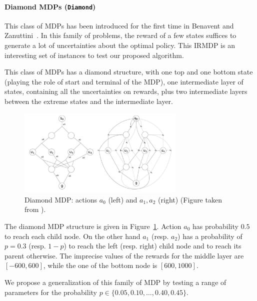 \paragraph{Diamond MDPs (\texttt{Diamond})}
This class of MDPs has been introduced for the first time in Benavent and Zanuttini~\cite{benavent2018}. 
In this family of problems, the reward of a few states suffices to generate a lot of uncertainties about the optimal policy. This IRMDP is an interesting set of instances to test our proposed algorithm. 

This class of MDPs has a diamond structure, with one top and one bottom state (playing the role of start and terminal of the MDP), one intermediate layer of states, containing all the uncertainties on rewards, plus two intermediate layers between the extreme states and the intermediate layer. 

\begin{figure}[h]
\begin{center}
\includegraphics[width=8cm]{images/diamond.png}
\end{center}
\caption{Diamond MDP: actions $a_0$ (left) and $a_1, a_2$ (right) (Figure taken from \cite{benavent2018}).}
\label{fig:diamond}
\end{figure}


The diamond MDP structure is given in Figure~\ref{fig:diamond}. Action $a_0$ has probability $0.5$ to reach each child node.  
On the other hand $a_1$ (resp. $a_2$) has a probability of $p= 0.3$ (resp. $1-p$) to reach the left (resp. right) child node and to reach its parent otherwise.
The imprecise values of the rewards for the middle layer are $[-600,600]$, while the one of the bottom node is $[600,1000]$.

We propose a generalization of this family of MDP by testing a range of parameters for the probability $p \in \{0.05,0.10,\dots,0.40,0.45\}$. %


